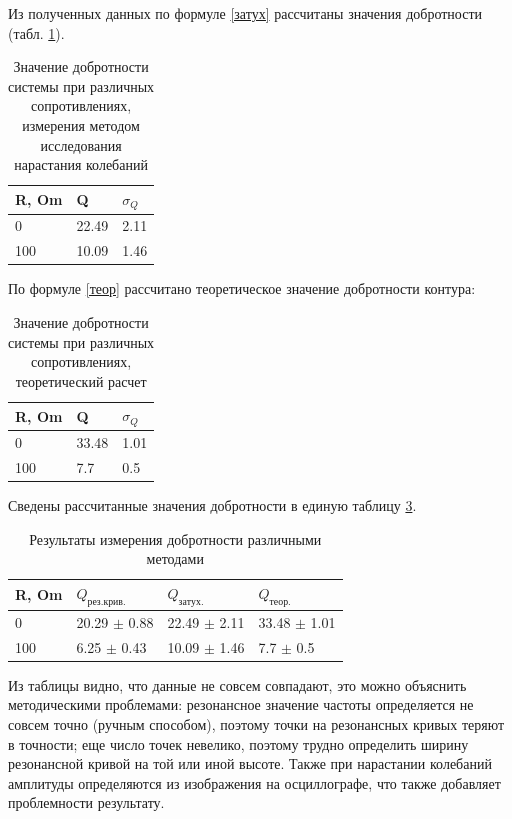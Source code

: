 \documentclass[a4paper,12pt]{article} %
\begin{document}
Из полученных данных по формуле \ref{затух} рассчитаны значения добротности (табл. \ref{затух_тбл}).
\begin{table}[h!]
\caption{Значение добротности системы при различных сопротивлениях, измерения методом исследования нарастания колебаний}
\label{затух_тбл}
\begin{tabular}{|l|l|l|}
\hline
R, Om & Q     & $\sigma_Q$ \\ \hline
0     & 22.49 & 2.11       \\ \hline
100   & 10.09 & 1.46       \\ \hline
\end{tabular}
\end{table}

По формуле \ref{теор} рассчитано теоретическое значение добротности контура:
\begin{table}[h!]
\caption{Значение добротности системы при различных сопротивлениях, теоретический расчет}
\label{теор_тбл}
\begin{tabular}{|l|l|l|}
\hline
R, Om & Q     & $\sigma_Q$ \\ \hline
0     & 33.48 & 1.01       \\ \hline
100   & 7.7 & 0.5       \\ \hline
\end{tabular}
\end{table}

Сведены рассчитанные значения добротности в единую таблицу \ref{един}.
\begin{table}[h!]
\caption{Результаты измерения добротности различными методами}
\label{един}
\begin{tabular}{|l|l|l|l|}
\hline
R, Om & $Q_{рез.крив.}$  & $Q_{затух.}$     & $Q_{теор.}$      \\ \hline
0     & 20.29 $\pm$ 0.88 & 22.49 $\pm$ 2.11 & 33.48 $\pm$ 1.01 \\ \hline
100   & 6.25 $\pm$ 0.43  & 10.09 $\pm$ 1.46 & 7.7 $\pm$ 0.5    \\ \hline
\end{tabular}
\end{table}

Из таблицы видно, что данные не совсем совпадают, это можно объяснить методическими проблемами: резонансное значение частоты определяется не совсем точно (ручным способом), поэтому точки на резонансных кривых теряют в точности; еще число точек невелико, поэтому трудно определить ширину резонансной кривой на той или иной высоте. Также при нарастании колебаний амплитуды определяются из изображения на осциллографе, что также добавляет проблемности результату.
\end{document}
